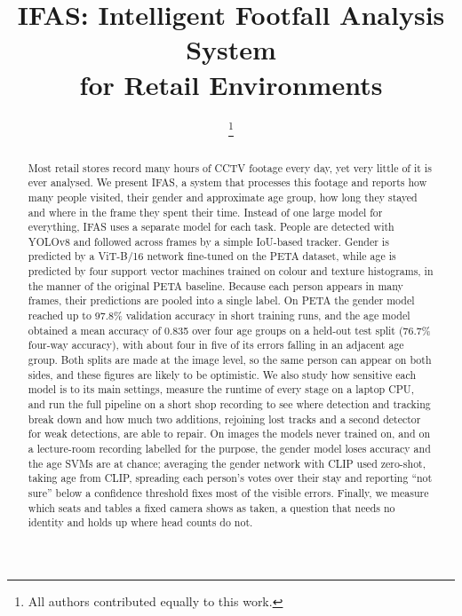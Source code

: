 \documentclass[conference]{IEEEtran}
\begin{document}
\title{IFAS: Intelligent Footfall Analysis System\\for Retail Environments}

\author{
\thanks{All authors contributed equally to this work.}}

\maketitle

\begin{abstract}
Most retail stores record many hours of CCTV footage every day, yet very little of
it is ever analysed. We present IFAS, a system that processes this footage and
reports how many people visited, their gender and approximate age group, how long
they stayed and where in the frame they spent their time. Instead of one large
model for everything, IFAS uses a separate model for each task. People are
detected with YOLOv8 and followed across frames by a simple IoU-based tracker.
Gender is predicted by a ViT-B/16 network fine-tuned on the PETA dataset, while age
is predicted by four support vector machines trained on colour and texture
histograms, in the manner of the original PETA baseline. Because each person
appears in many frames, their predictions are pooled into a single label. On PETA
the gender model reached up to 97.8\% validation accuracy in short training runs,
and the age model obtained a mean accuracy of 0.835 over four age groups on a
held-out test split (76.7\% four-way accuracy), with about four in five of its
errors falling in an adjacent age group. Both splits are made at the image level,
so the same person can appear on both sides, and these figures are likely to be
optimistic. We also study how sensitive each model is to its main settings,
measure the runtime of every stage on a laptop CPU, and run the full pipeline on a
short shop recording to see where detection and tracking break down and how much
two additions, rejoining lost tracks and a second detector for weak detections,
are able to repair. On images the models never trained on, and on a lecture-room
recording labelled for the purpose, the gender model loses accuracy and the age
SVMs are at chance; averaging the gender network with CLIP used zero-shot, taking
age from CLIP, spreading each person's votes over their stay and reporting
``not sure'' below a confidence threshold fixes most of the visible errors.
Finally, we measure which seats and tables a fixed camera shows as taken, a
question that needs no identity and holds up where head counts do not.
\end{abstract}
\end{document}
